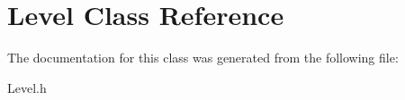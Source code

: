 \hypertarget{class_level}{\section{\-Level \-Class \-Reference}
\label{class_level}
}


\-The documentation for this class was generated from the following file\-:\begin{DoxyCompactItemize}
\item 
\-Level.\-h\end{DoxyCompactItemize}

